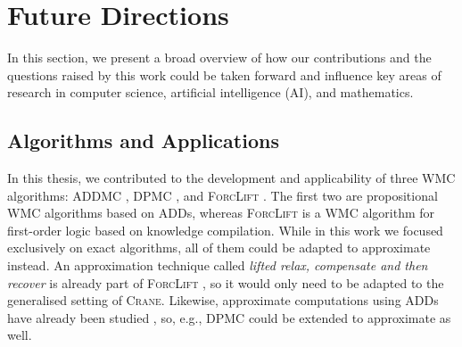 

\section{Future Directions}\label{sec:future}

In this section, we present a broad overview of how our contributions and the
questions raised by this work could be taken forward and influence key areas of
research in computer science, artificial intelligence (AI), and mathematics.

\subsection{Algorithms and Applications}


In this thesis, we contributed to the development and applicability of three WMC
algorithms: \textsc{ADDMC} \citep{DBLP:conf/aaai/DudekPV20}, \textsc{DPMC}
\citep{DBLP:conf/cp/DudekPV20}, and \textsc{ForcLift}
\citep{DBLP:conf/ijcai/BroeckTMDR11}. The first two are propositional WMC
algorithms based on ADDs, whereas \textsc{ForcLift} is a WMC algorithm for
first-order logic based on knowledge compilation. While in this work we focused
exclusively on exact algorithms, all of them could be adapted to approximate
instead. An approximation technique called \emph{lifted relax, compensate and
  then recover} is already part of \textsc{ForcLift}
\citep{DBLP:conf/uai/BroeckCD12}, so it would only need to be adapted to the
generalised setting of \textsc{Crane}. Likewise, approximate computations using
ADDs have already been studied \citep{DBLP:conf/nips/St-AubinHB00}, so, e.g.,
\textsc{DPMC} could be extended to approximate as well.

